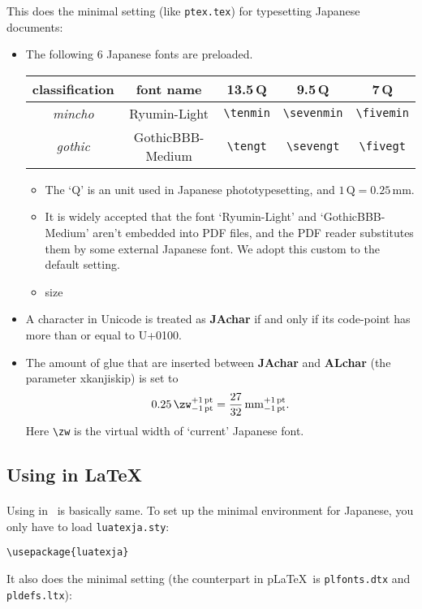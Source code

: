 \documentclass[a4paper,titlepage]{article}
\begin{document}
This does the minimal setting (like {\tt ptex.tex}) for typesetting Japanese documents:
\begin{itemize}
\item The following 6 Japanese fonts are preloaded.
\begin{center}
\begin{tabular}{ccccc}
\toprule
\textbf{classification}&\textbf{font name}&\textbf{13.5\,Q}&\textbf{9.5\,Q}&\textbf{7\,Q}\\\midrule
\textit{mincho}&Ryumin-Light    &\verb+\tenmin+&\verb+\sevenmin+&\verb+\fivemin+\\
\textit{gothic}&GothicBBB-Medium&\verb+\tengt+ &\verb+\sevengt+ &\verb+\fivegt+\\
\bottomrule
\end{tabular}
\end{center}
\begin{itemize}
\item The `Q' is an unit used in Japanese phototypesetting, and $1\,\textrm{Q}=0.25\,\textrm{mm}$.
\item It is widely accepted that the font `Ryumin-Light' and `GothicBBB-Medium' aren't embedded into PDF files, and
the PDF reader substitutes them by some external Japanese font. We adopt this custom to the default setting.
\item size
\end{itemize}
\item A character in Unicode is treated as \textbf{JAchar} if and only if its code-point has more than or equal to U+0100.
\item The amount of glue that are inserted between \textbf{JAchar} and \textbf{ALchar} (the parameter {\sf xkanjiskip}) is
set to
\[
 0.25\,\hbox{\verb+\zw+}^{+1\,\text{pt}}_{-1\,\text{pt}} = \frac{27}{32}\,\mathrm{mm}^{+1\,\text{pt}}_{-1\,\text{pt}}.
\]
Here \verb+\zw+ is the virtual width of `current' Japanese font.
\end{itemize}


\subsection{Using in \LaTeX}
\paragraph{\LaTeXe}
Using in \LaTeXe\ is basically same. To set up the minimal environment for Japanese, you only have to load {\tt luatexja.sty}:
\begin{verbatim}
\usepackage{luatexja}
\end{verbatim}
It also does the minimal setting (the counterpart in p\LaTeX\ is  {\tt plfonts.dtx} and {\tt pldefs.ltx}):
\end{document}
